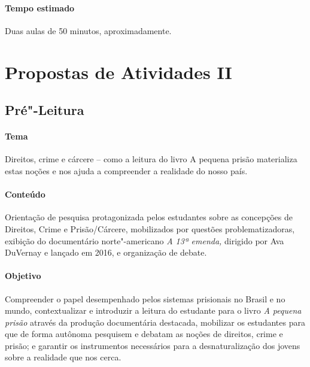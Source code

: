 \documentclass[11pt]{extarticle}
\begin{document}
\paragraph{Tempo estimado} Duas aulas de 50 minutos, aproximadamente.


\section{Propostas de Atividades II}


\subsection{Pré"-Leitura}

\paragraph{Tema} Direitos, crime e cárcere -- como a leitura do livro A
pequena prisão materializa estas noções e nos ajuda a compreender a
realidade do nosso país.

\paragraph{Conteúdo} Orientação de pesquisa protagonizada pelos estudantes
sobre as concepções de Direitos, Crime e Prisão/Cárcere, mobilizados por
questões problematizadoras, exibição do documentário norte"-americano
\emph{A 13ª emenda,} dirigido por Ava DuVernay e lançado em 2016, e
organização de debate.

\paragraph{Objetivo} Compreender o papel desempenhado pelos sistemas
prisionais no Brasil e no mundo, contextualizar e introduzir a leitura do
estudante para o livro \emph{A pequena prisão} através da produção
documentária destacada, mobilizar os estudantes para que de forma
autônoma pesquisem e debatam as noções de direitos, crime e prisão; e
garantir os instrumentos necessários para a desnaturalização dos jovens
sobre a realidade que nos cerca.
\end{document}
